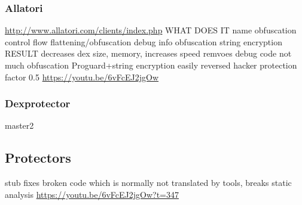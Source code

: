 \subsubsection{Allatori}
\url{http://www.allatori.com/clients/index.php}\newline
WHAT DOES IT\newline
name obfuscation\newline
control flow flattening/obfuscation\newline
debug info obfuscation\newline
string encryption\newline
RESULT\newline
decreases dex size, memory, increases speed\newline
remvoes debug code\newline
not much obfuscation\newline
Proguard+string encryption\newline
easily reversed\newline
hacker protection factor 0.5\newline
\url{https://youtu.be/6vFcEJ2jgOw}

\subsubsection{Dexprotector}\label{subsection:software-dexprotector}
master2


\subsection{Protectors}
stub fixes broken code which is normally not translated by tools, breaks static analysis \newline
\url{https://youtu.be/6vFcEJ2jgOw?t=347}\newline
